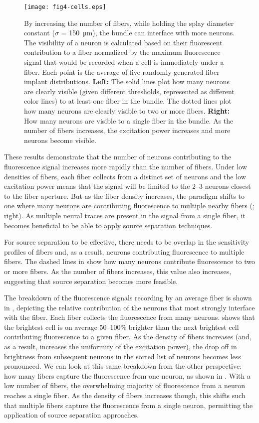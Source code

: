 \begin{figure}
\texttt{[image: fig4-cells.eps]}
\caption[Effect of fiber count on number of neurons contributing signal]{By increasing the number of fibers, while holding the splay diameter constant ($\sigma$ = 150~\si{\micro\meter}), the bundle can interface with more neurons. The visibility of a neuron is calculated based on their fluorescent contribution to a fiber normalized by the maximum fluorescence signal that would be recorded when a cell is immediately under a fiber. Each point is the average of five randomly generated fiber implant distributions. \textbf{Left:} The solid lines plot how many neurons are clearly visible (given different thresholds, represented as different color lines) to at least one fiber in the bundle. The dotted lines plot how many neurons are clearly visible to two or more fibers. \textbf{Right:} How many neurons are visible to a single fiber in the bundle. As the number of fibers increases, the excitation power increases and more neurons become visible.}
\label{fig:cells}
\end{figure}

These results demonstrate that the number of neurons contributing to the fluorescence signal increases more rapidly than the number of fibers. Under low densities of fibers, each fiber collects from a distinct set of neurons and the low excitation power means that the signal will be limited to the 2--3 neurons closest to the fiber aperture. But as the fiber density increases, the paradigm shifts to one where many neurons are contributing fluorescence to multiple nearby fibers (; right). As multiple neural traces are present in the signal from a single fiber, it becomes beneficial to be able to apply source separation techniques.

For source separation to be effective, there needs to be overlap in the sensitivity profiles of fibers and, as a result, neurons contributing fluorescence to multiple fibers. The dashed lines in  show how many neurons contribute fluorescence to two or more fibers. As the number of fibers increases, this value also increases, suggesting that source separation becomes more feasible.

The breakdown of the fluorescence signals recording by an average fiber is shown in , depicting the relative contribution of the neurons that most strongly interface with the fiber. Each fiber collects the fluorescence from many neurons.  shows that the brightest cell is on average 50--100\% brighter than the next brightest cell contributing fluorescence to a given fiber. As the density of fibers increases (and, as a result, increases the uniformity of the excitation power), the drop off in brightness from subsequent neurons in the sorted list of neurons becomes less pronounced. We can look at this same breakdown from the other perspective: how many fibers capture the fluorescence from one neuron, as shown in . With a low number of fibers, the overwhelming majority of fluorescence from a neuron reaches a single fiber. As the density of fibers increases though, this shifts such that multiple fibers capture the fluorescence from a single neuron, permitting the application of source separation approaches.

